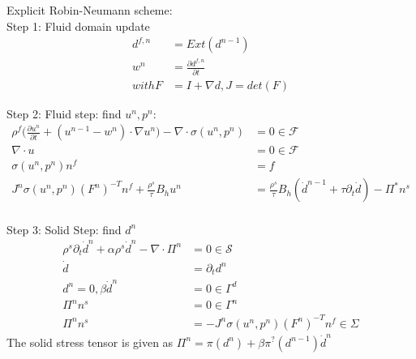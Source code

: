 \newpage
Explicit Robin-Neumann scheme: \\
Step 1:
Fluid domain update
\begin{align*}
d^{f,n} &= Ext(d^{n-1}) \\
w^n &= \frac{\partial d^{f,n}}{\partial t} \\
with F &= I + \nabla d, J= det(F)
\end{align*}

Step 2:
Fluid step: find $u^n, p^n$:
\begin{align*}
\rho^f \big( \frac{\partial u^{n}}{\partial t} + ( u^{n-1} - w^n ) \cdot \nabla u^n \big) - \nabla \cdot \sigma(u^n,p^n) &= 0  \in  \mathcal{F} \\
\nabla \cdot u &= 0  \in \mathcal{F} \\
\sigma(u^n, p^n) n^f &= f \\
J^n \sigma(u^n, p^n)(F^n)^{-T}n^f + \frac{\rho^s}{\tau} B_h u^n &= \frac{\rho^s}{\tau} B_h (\dot{d}^{n-1} + \tau \partial_t \dot{d}  ) - \Pi^{*} n^s \\
\end{align*}

Step 3:
Solid Step: find $d^n$
\begin{align*}
\rho^s \partial_t \dot{d}^n + \alpha \rho^s \dot{d}^n - \nabla \cdot \Pi^n &= 0 \in \mathcal{S} \\
\dot{d} &= \partial_t d^n \\
d^n = 0, \beta \dot{d}^n &= 0 \in \Gamma^d  \\
\Pi^n n^s &= 0 \in \Gamma^n \\
\Pi^n n^s &= -J^n \sigma(u^n, p^n) (F^n)^{-T}n^f \in \Sigma 
\end{align*}
The solid stress tensor is given as $ \Pi^n = \pi(d^n) + \beta \pi^{?}(d^{n-1}) \dot{d}^n $

